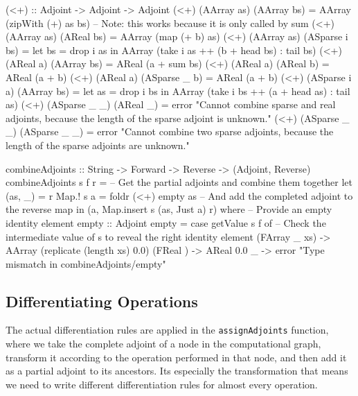         \begin{haskell}[caption=Adjoint combination operator and adjoint summation function, label=lst:combine, gobble=12]
            (<+) :: Adjoint -> Adjoint -> Adjoint
            (<+) (AArray as)   (AArray    bs) = AArray (zipWith (+) as bs)
            -- Note: this works because it is only called by sum
            (<+) (AArray as)   (AReal     bs) = AArray (map (+ b) as)
            (<+) (AArray as)   (ASparse i bs) =
                let bs = drop i as
                in  AArray (take i as ++ (b + head bs) : tail bs)
            (<+) (AReal  a)    (AArray    bs) = AReal (a + sum bs)
            (<+) (AReal  a)    (AReal     b)  = AReal (a + b)
            (<+) (AReal  a)    (ASparse _ b)  = AReal (a + b)
            (<+) (ASparse i a) (AArray    bs) = 
                let as = drop i bs
                in  AArray (take i bs ++ (a + head as) : tail as)
            (<+) (ASparse _ _) (AReal     _)  = error "Cannot combine sparse and real
                adjoints, because the length of the sparse adjoint is unknown."
            (<+) (ASparse _ _) (ASparse _ _)  = error "Cannot combine two sparse adjoints,
                because the length of the sparse adjoints are unknown."

            combineAdjoints :: String -> Forward -> Reverse -> (Adjoint, Reverse)
            combineAdjoints s f r =
                -- Get the partial adjoints and combine them together
                let (as, _) = r Map.! s
                    a       = foldr (<+) empty as
                -- And add the completed adjoint to the reverse map
                in  (a, Map.insert s (as, Just a) r)
                where
                    -- Provide an empty identity element
                    empty :: Adjoint
                    empty = case getValue s f of
                        -- Check the intermediate value of s to reveal the right identity element
                        (FArray _ xs) -> AArray (replicate (length xs) 0.0)
                        (FReal  {})   -> AReal  0.0
                        _             -> error "Type mismatch in combineAdjoints/empty"
        \end{haskell}

    \clearpage
    \subsection{Differentiating Operations}
        The actual differentiation rules are applied in the \texttt{assignAdjoints} function, where we take the complete adjoint of a node in the computational graph, transform it according to the operation performed in that node, and then add it as a partial adjoint to its ancestors.
        Its especially the transformation that means we need to write different differentiation rules for almost every operation.

